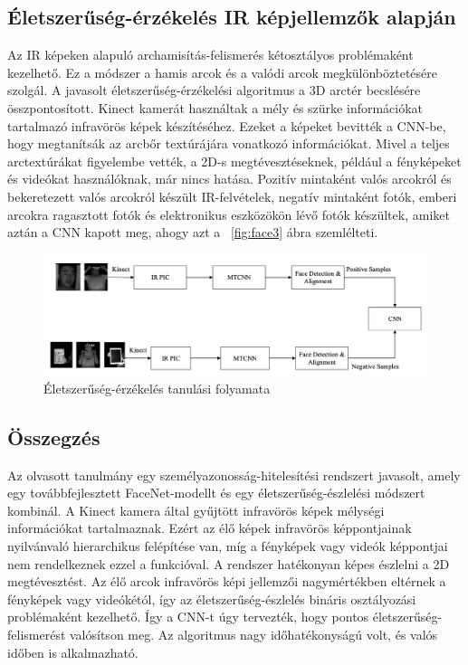 \subsection{Életszerűség-érzékelés IR képjellemzők alapján}

Az IR képeken alapuló archamisítás-felismerés kétosztályos problémaként kezelhető. Ez a módszer a hamis arcok és a valódi arcok megkülönböztetésére szolgál. A javasolt életszerűség-érzékelési algoritmus a 3D arctér becslésére összpontosított. Kinect kamerát használtak a mély és szürke információkat tartalmazó infravörös képek készítéséhez. Ezeket a képeket bevitték a CNN-be, hogy megtanítsák az arcbőr textúrájára vonatkozó információkat. Mivel a teljes arctextúrákat figyelembe vették, a 2D-s megtévesztéseknek, például a fényképeket és videókat használóknak, már nincs hatása. Pozitív mintaként valós arcokról és bekeretezett valós arcokról készült IR-felvételek, negatív mintaként fotók, emberi arcokra ragasztott fotók és elektronikus eszközökön lévő fotók készültek, amiket aztán a CNN kapott meg, ahogy azt a ~\ref{fig:face3} ábra szemlélteti.

\begin{figure}[htbp]
	\includegraphics[width=\textwidth]{figures/live_training.png}
	\caption{Életszerűség-érzékelés tanulási folyamata \cite{18}}
	\label{fig:face4}
\end{figure}

\subsection{Összegzés}

Az olvasott tanulmány egy személyazonosság-hitelesítési rendszert javasolt, amely egy továbbfejlesztett FaceNet-modellt és egy életszerűség-észlelési módszert kombinál. A Kinect kamera által gyűjtött infravörös képek mélységi információkat tartalmaznak. Ezért az élő képek infravörös képpontjainak nyilvánvaló hierarchikus felépítése van, míg a fényképek vagy videók képpontjai nem rendelkeznek ezzel a funkcióval. A rendszer hatékonyan képes észlelni a 2D megtévesztést. Az élő arcok infravörös képi jellemzői nagymértékben eltérnek a fényképek vagy videókétól, így az életszerűség-észlelés bináris osztályozási problémaként kezelhető. Így a CNN-t úgy tervezték, hogy pontos életszerűség-felismerést valósítson meg. Az algoritmus nagy időhatékonyságú volt, és valós időben is alkalmazható.


